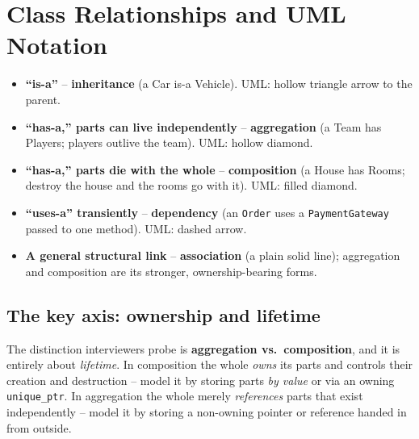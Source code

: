 \section{Class Relationships and UML Notation}
\label{sec:lld-relationships}


\begin{patternbox}
\begin{itemize}
  \item \textbf{``is-a''} -- \textbf{inheritance} (a Car is-a Vehicle).
        UML: hollow triangle arrow to the parent.
  \item \textbf{``has-a,'' parts can live independently} --
        \textbf{aggregation} (a Team has Players; players outlive the
        team). UML: hollow diamond.
  \item \textbf{``has-a,'' parts die with the whole} --
        \textbf{composition} (a House has Rooms; destroy the house and
        the rooms go with it). UML: filled diamond.
  \item \textbf{``uses-a'' transiently} -- \textbf{dependency} (an
        \texttt{Order} uses a \texttt{PaymentGateway} passed to one
        method). UML: dashed arrow.
  \item \textbf{A general structural link} -- \textbf{association}
        (a plain solid line); aggregation and composition are its
        stronger, ownership-bearing forms.
\end{itemize}
\end{patternbox}

\subsection*{The key axis: ownership and lifetime}

The distinction interviewers probe is \textbf{aggregation vs.\
composition}, and it is entirely about \emph{lifetime}. In composition the
whole \emph{owns} its parts and controls their creation and destruction --
model it by storing parts \emph{by value} or via an owning
\texttt{unique\_ptr}. In aggregation the whole merely \emph{references}
parts that exist independently -- model it by storing a non-owning pointer
or reference handed in from outside.


